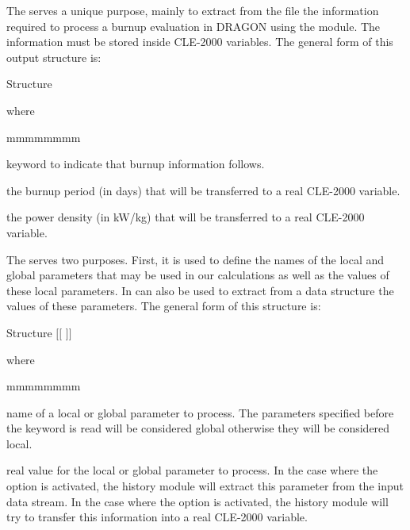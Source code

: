The  serves a unique purpose, mainly to extract from the  file the information required to process a burnup evaluation in DRAGON using
the  module. The information must be stored inside CLE-2000 variables. The general form of this output structure is:

\begin{DataStructure}{Structure }
   \\
\end{DataStructure}
\noindent
 where
\begin{ListeDeDescription}{mmmmmmmm}   

\item[\moc{BURN}] keyword to indicate that burnup information follows.

\item[\dusa{period}] the burnup period (in days) that will be transferred to a real CLE-2000 variable. 

\item[\dusa{power}] the power density (in kW/kg) that will be transferred to a real CLE-2000 variable. 
\end{ListeDeDescription}


The  serves two purposes. First, it is used to define the names of the local and global parameters that may be used in our calculations as well as
the values of these local parameters. In can also be used to extract from a  data structure the values of these parameters. The general form of
this structure is:

\begin{DataStructure}{Structure }
$[[$   $]]$ 
\end{DataStructure}

\noindent
 where
\begin{ListeDeDescription}{mmmmmmmm}   

\item[\dusa{NAMPAR}] name of a local or global parameter to process. The parameters specified before the keyword  is read will be considered global
otherwise they will be considered local.

\item[\dusa{valpar}] real value for the local or global parameter to process. In the case where the  option is activated, the history module will
extract this parameter from the input data stream. In the case where the  option is activated, the history module will try to transfer this information
into a real CLE-2000 variable.
\end{ListeDeDescription}
 
